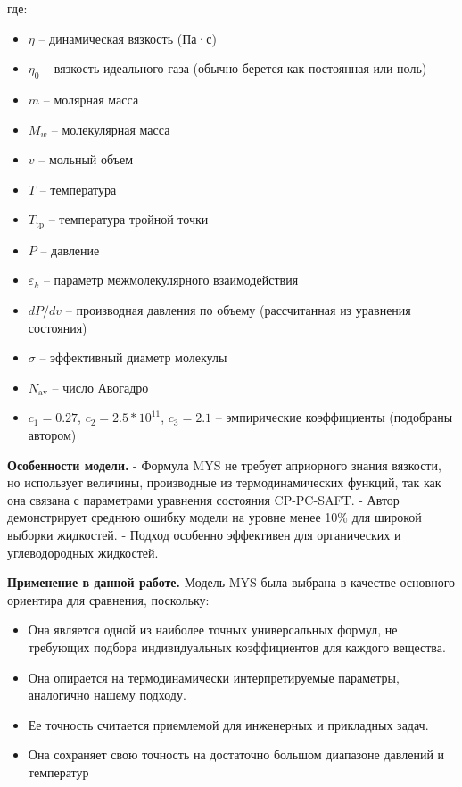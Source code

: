 \documentclass[a4paper,12pt]{article}
\begin{document}
      где:  
      \begin{itemize}
        \item $\eta$ -- динамическая вязкость (Па·с)
        \item $\eta_0$ -- вязкость идеального газа (обычно берется как постоянная или ноль)
        \item $m$ -- молярная масса
        \item $M_w$ -- молекулярная масса
        \item $v$ -- мольный объем
        \item $T$ -- температура
        \item $T_{\text{tp}}$ -- температура тройной точки
        \item $P$ -- давление
        \item $\varepsilon_k$ -- параметр межмолекулярного взаимодействия
        \item $dP/dv$ -- производная давления по объему (рассчитанная из уравнения состояния)
        \item $\sigma$ -- эффективный диаметр молекулы
        \item $N_{\text{av}}$ -- число Авогадро
        \item $c_1=0.27$, $c_2=2.5*10^{11}$, $c_3=2.1$ -- эмпирические коэффициенты (подобраны автором)
      \end{itemize}
      
      \textbf{Особенности модели.}  
      - Формула MYS не требует априорного знания вязкости, но использует величины, производные из термодинамических функций, так как она связана с параметрами уравнения состояния CP-PC-SAFT.
      - Автор демонстрирует среднюю ошибку модели на уровне менее 10\% для широкой выборки жидкостей.
      - Подход особенно эффективен для органических и углеводородных жидкостей.
      
      \textbf{Применение в данной работе.}  
      Модель MYS была выбрана в качестве основного ориентира для сравнения, поскольку:
      \begin{itemize}
        \item Она является одной из наиболее точных универсальных формул, не требующих подбора индивидуальных коэффициентов для каждого вещества.
        \item Она опирается на термодинамически интерпретируемые параметры, аналогично нашему подходу.
        \item Ее точность считается приемлемой для инженерных и прикладных задач.
        \item Она сохраняет свою точность на достаточно большом диапазоне давлений и температур
      \end{itemize}
      
\end{document}
